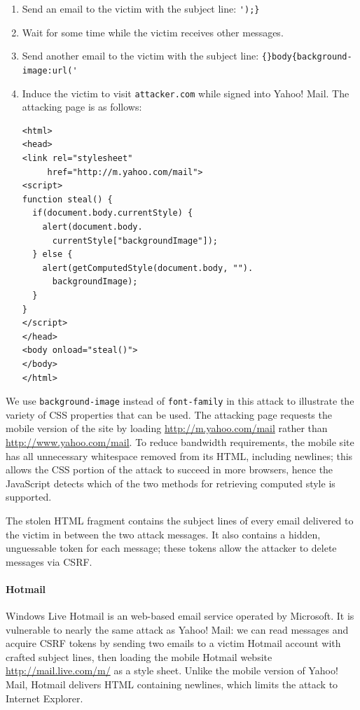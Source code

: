 \documentclass{acm_proc_article-sp}
\begin{document}
\begin{enumerate}
\item Send an email to the victim with the subject line:
  \verb|');}|
\item Wait for some time while the victim receives other messages.
\item Send another email to the victim with the subject line:
  \verb|{}body{background-image:url('|
\item Induce the victim to visit \texttt{attacker.com} while signed
  into Yahoo! Mail.  The attacking page is as follows:
\begin{verbatim}
<html>
<head>
<link rel="stylesheet"
     href="http://m.yahoo.com/mail">
<script>
function steal() {
  if(document.body.currentStyle) {
    alert(document.body.
      currentStyle["backgroundImage"]);
  } else {
    alert(getComputedStyle(document.body, "").
      backgroundImage);
  }
}
</script>
</head>
<body onload="steal()">
</body>
</html>
\end{verbatim}
\end{enumerate}

We use \texttt{background-image} instead of \texttt{font-family} in
this attack to illustrate the variety of CSS properties that can be
used.  The attacking page requests the mobile version of the site by
loading \url{http://m.yahoo.com/mail} rather than
\url{http://www.yahoo.com/mail}.  To reduce bandwidth requirements,
the mobile site has all unnecessary whitespace removed from its HTML,
including newlines; this allows the CSS portion of the attack to
succeed in more browsers, hence the JavaScript detects which of
the two methods for retrieving computed style is supported.

The stolen HTML fragment contains the subject lines of every email
delivered to the victim in between the two attack messages.  It also
contains a hidden, unguessable token for each message; these tokens
allow the attacker to delete messages via CSRF.

\paragraph{Hotmail}
Windows Live Hotmail is an web-based email service operated by
Microsoft. It is vulnerable to nearly the same attack as Yahoo!
Mail: we can read messages and acquire CSRF tokens by sending
two emails to a victim Hotmail account with crafted subject
lines, then loading the mobile Hotmail website
\url{http://mail.live.com/m/} as a style sheet. Unlike the
mobile version of Yahoo! Mail, Hotmail delivers HTML containing
newlines, which limits the attack to Internet Explorer.
\end{document}
